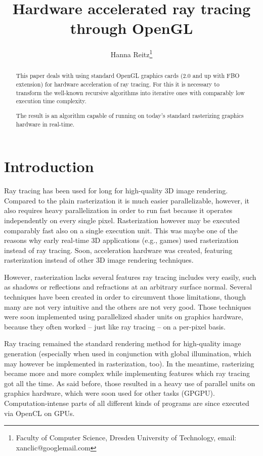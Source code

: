 \documentclass[english,fleqn,10pt,twocolumn]{article}
\date{}
\title{Hardware accelerated ray tracing through OpenGL}
\author{Hanna Reitz\thanks{Faculty of Computer Science, Dresden University of Technology, email: xanclic@googlemail.com}}
\begin{document}
\maketitle

\begin{abstract}
    This paper deals with using standard OpenGL graphics cards (2.0 and up with FBO extension) for hardware acceleration of ray tracing. For this it is necessary to transform the well-known recursive algorithms into iterative ones with
    comparably low execution time complexity. \par
    The result is an algorithm capable of running on today's standard rasterizing graphics hardware in real-time.
\end{abstract}


\section{Introduction}

Ray tracing has been used for long for high-quality 3D image rendering. Compared to the plain rasterization it is much easier parallelizable, however, it also requires heavy parallelization in order to run fast because it operates
independently on every single pixel. Rasterization however may be executed comparably fast also on a single execution unit. This was maybe one of the reasons why early real-time 3D applications (e.g., games) used rasterization instead
of ray tracing. Soon, acceleration hardware was created, featuring rasterization instead of other 3D image rendering techniques.

However, rasterization lacks several features ray tracing includes very easily, such as shadows or reflections and refractions at an arbitrary surface normal. Several techniques have been created in order to circumvent those limitations,
though many are not very intuitive and the others are not very good. Those techniques were soon implemented using parallelized shader units on graphics hardware, because they often worked -- just like ray tracing -- on a per-pixel basis.

Ray tracing remained the standard rendering method for high-quality image generation (especially when used in conjunction with global illumination, which may however be implemented in rasterization, too). In the meantime, rasterizing
became more and more complex while implementing features which ray tracing got all the time. As said before, those resulted in a heavy use of parallel units on graphics hardware, which were soon used for other tasks (GPGPU).
Computation-intense parts of all different kinds of programs are since executed via OpenCL on GPUs.
\end{document}
